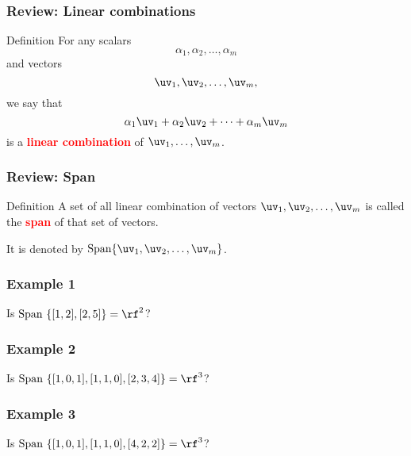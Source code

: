 

\begin{frame}
  \frametitle{Review: Linear combinations}

  \begin{block}{Definition}
    For any scalars
    \[
    \alpha_1,\alpha_2,\ldots,\alpha_m
    \]
    and vectors
    \[
    \uv_1,\uv_2,\ldots,\uv_m,
    \]
    we say that
    \[
    \alpha_1\uv_1 + \alpha_2\uv_2 + \cdots + \alpha_m \uv_m
    \]
    is a \textcolor{red}{\bf linear combination} of $\uv_1,\ldots,\uv_m$.
  \end{block}
\end{frame}

\begin{frame}
  \frametitle{Review: Span}

  \begin{block}{Definition}
    A set of all linear combination of vectors $\uv_1,\uv_2,\ldots,\uv_m$ is called the \textcolor{red}{\bf span} of that set of vectors.

    It is denoted by $\mathrm{Span} \{\uv_1,\uv_2,\ldots,\uv_m\}$.
  \end{block}
\end{frame}

\begin{frame}
  \frametitle{Example 1}
  Is $\mathrm{Span}\ \{[1,2],[2,5]\} = \rf^2$?
  \vspace{2.5in}
\end{frame}

\begin{frame}
  \frametitle{Example 2}
  Is $\mathrm{Span}\ \{[1,0,1],[1,1,0],[2,3,4]\} = \rf^3$?
  \vspace{2.5in}
\end{frame}

\begin{frame}
  \frametitle{Example 3}
  Is $\mathrm{Span}\ \{[1,0,1],[1,1,0],[4,2,2]\} = \rf^3$?
  \vspace{2.5in}
\end{frame}

